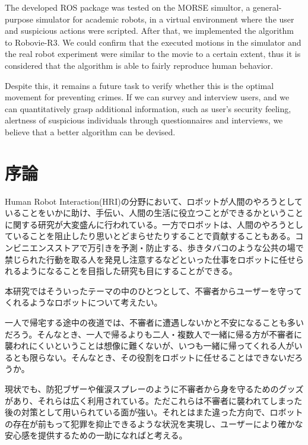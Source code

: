 \documentclass{kuisthesis}
\begin{document}
\begin{eabstract}
	The developed ROS package was tested on the MORSE simultor, a general-purpose simulator for academic robots, in a virtual environment where the user and suspicious actions were scripted. After that, we implemented the algorithm to Robovie-R3. We could confirm that the executed motions in the simulator and the real robot experiment were similar to the movie to a certain extent, thus it is considered that the algorithm is able to fairly reproduce human behavior.

	Despite this, it remains a future task to verify whether this is the optimal movement for preventing crimes. If we can survey and interview users, and we can quantitatively grasp additional information, such as user's security feeling, alertness of suspicious individuals through questionnaires and interviews, we believe that a better algorithm can be devised.
\end{eabstract}

\tableofcontents






\section{序論}

Human Robot Interaction(HRI)の分野において、ロボットが人間のやろうとしていることをいかに助け、手伝い、人間の生活に役立つことができるかということに関する研究が大変盛んに行われている。一方でロボットは、人間のやろうとしていることを阻止したり思いとどまらせたりすることで貢献することもある。コンビニエンスストアで万引きを予測・防止する、歩きタバコのような公共の場で禁じられた行動を取る人を発見し注意するなどといった仕事をロボットに任せられるようになることを目指した研究も目にすることができる。

本研究ではそういったテーマの中のひとつとして、不審者からユーザーを守ってくれるようなロボットについて考えたい。

一人で帰宅する途中の夜道では、不審者に遭遇しないかと不安になることも多いだろう。そんなとき、一人で帰るよりも二人・複数人で一緒に帰る方が不審者に襲われにくいということは想像に難くないが、いつも一緒に帰ってくれる人がいるとも限らない。そんなとき、その役割をロボットに任せることはできないだろうか。

現状でも、防犯ブザーや催涙スプレーのように不審者から身を守るためのグッズがあり、それらは広く利用されている。ただこれらは不審者に襲われてしまった後の対策として用いられている面が強い。それとはまた違った方向で、ロボットの存在が前もって犯罪を抑止できるような状況を実現し、ユーザーにより確かな安心感を提供するための一助になればと考える。
\end{document}
